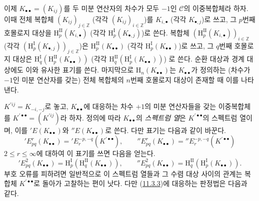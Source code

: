 \begin{env}[11.3.5]
\label{0.11.3.5-fr}
이제 $K_{\bullet\bullet}=(K_{ij})$를 두 미분 연산자의 차수가 모두
$-1$인 $\mathcal C$의 이중복합체라 하자. 이때 전체 복합체
$(K_{ij})_{j\in\mathbb Z}$ (각각 $(K_{ij})_{i\in\mathbb Z}$)를
$K_{i,\bullet}$ (각각 $K_{\bullet,j}$)로 쓰고, 그 $p$번째 호몰로지 대상을
$\mathrm H_p^{\mathrm{II}}(K_{i,\bullet})$ (각각
$\mathrm H_p^{\mathrm I}(K_{\bullet,j})$)로 쓴다. 복합체
$(\mathrm H_p^{\mathrm{II}}(K_{i,\bullet}))_{i\in\mathbb Z}$ (각각
$(\mathrm H_p^{\mathrm I}(K_{\bullet,j}))_{j\in\mathbb Z}$)은
$\mathrm H_p^{\mathrm{II}}(K_{\bullet\bullet})$ (각각
$\mathrm H_p^{\mathrm I}(K_{\bullet\bullet})$)로 쓰고, 그 $q$번째
호몰로지 대상은
$\mathrm H_q^{\mathrm I}(\mathrm H_p^{\mathrm{II}}(K_{\bullet\bullet}))$
(각각
$\mathrm H_q^{\mathrm{II}}(\mathrm H_p^{\mathrm I}(K_{\bullet\bullet}))$)
로 쓴다. 순환 대상과 경계 대상에도 이와 유사한 표기를 쓴다. 마지막으로
$\mathrm H_n(K_{\bullet\bullet})$는 $K_{\bullet\bullet}$가 정의하는
(차수가 $-1$인 미분 연산자를 갖는) 전체 복합체의 $n$번째 호몰로지 대상이
존재할 때 이를 나타낸다.

$K^{\prime ij}=K_{-i,-j}$로 놓고, $K_{\bullet\bullet}$에 대응하는 차수
$+1$의 미분 연산자들을 갖는 이중복합체를
$K^{\prime\bullet\bullet}=(K^{\prime ij})$라 하자. 정의에 따라
$K_{\bullet\bullet}$의 \emph{스펙트럼 열}은
$K^{\prime\bullet\bullet}$의 스펙트럼 열이며, 이를
$'E(K_{\bullet\bullet})$와 $''E(K_{\bullet\bullet})$로 쓴다. 다만 표기는
다음과 같이 바꾼다.
\[
  'E_{pq}^r(K_{\bullet\bullet})
  ='E_r^{-p,-q}(K^{\prime\bullet\bullet}),\qquad
  ''E_{pq}^r(K_{\bullet\bullet})
  =''E_r^{-p,-q}(K^{\prime\bullet\bullet})
\]
$2\leq r\leq\infty$에 대하여 이 표기를 쓰면 다음을 얻는다.
\[
  'E_{pq}^2(K_{\bullet\bullet})
  =\mathrm H_p^{\mathrm I}(\mathrm H_q^{\mathrm{II}}(K_{\bullet\bullet})),
  \qquad
  ''E_{pq}^2(K_{\bullet\bullet})
  =\mathrm H_q^{\mathrm{II}}(\mathrm H_p^{\mathrm I}(K_{\bullet\bullet})).
\]
부호 오류를 피하려면 일반적으로 이 스펙트럼 열들과 그 수렴 대상 사이의
관계는 복합체 $K^{\prime\bullet\bullet}$로 돌아가 고찰하는 편이 낫다.
다만 (\hyperref[0.11.3.3-fr]{11.3.3})에 대응하는 판정법은 다음과 같다.
\end{env}

